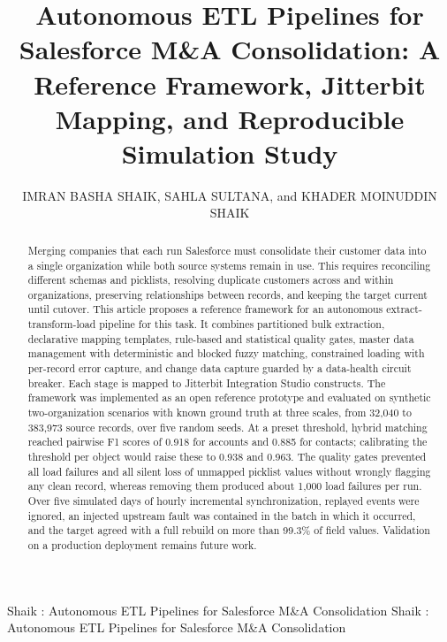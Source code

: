 \documentclass{ieeeaccess}
\begin{document}

\title{Autonomous ETL Pipelines for Salesforce M\&A Consolidation: A Reference Framework, Jitterbit Mapping, and Reproducible Simulation Study}
\author{\uppercase{Imran Basha Shaik}, \uppercase{Sahla Sultana}, and \uppercase{Khader Moinuddin Shaik}}

\address[1]{Frisco, TX, USA (e-mail: imran.shaik159@gmail.com; ORCID: 0009-0002-1210-5646)}
\address[2]{Frisco, TX, USA}

\markboth
{Shaik \headeretal: Autonomous ETL Pipelines for Salesforce M\&A Consolidation}
{Shaik \headeretal: Autonomous ETL Pipelines for Salesforce M\&A Consolidation}


\begin{abstract}
Merging companies that each run Salesforce must consolidate their customer data into a single organization while both source systems remain in use. This requires reconciling different schemas and picklists, resolving duplicate customers across and within organizations, preserving relationships between records, and keeping the target current until cutover. This article proposes a reference framework for an autonomous extract-transform-load pipeline for this task. It combines partitioned bulk extraction, declarative mapping templates, rule-based and statistical quality gates, master data management with deterministic and blocked fuzzy matching, constrained loading with per-record error capture, and change data capture guarded by a data-health circuit breaker. Each stage is mapped to Jitterbit Integration Studio constructs. The framework was implemented as an open reference prototype and evaluated on synthetic two-organization scenarios with known ground truth at three scales, from 32,040 to 383,973 source records, over five random seeds. At a preset threshold, hybrid matching reached pairwise F1 scores of 0.918 for accounts and 0.885 for contacts; calibrating the threshold per object would raise these to 0.938 and 0.963. The quality gates prevented all load failures and all silent loss of unmapped picklist values without wrongly flagging any clean record, whereas removing them produced about 1,000 load failures per run. Over five simulated days of hourly incremental synchronization, replayed events were ignored, an injected upstream fault was contained in the batch in which it occurred, and the target agreed with a full rebuild on more than 99.3\% of field values. Validation on a production deployment remains future work.
\end{abstract}
\end{document}
